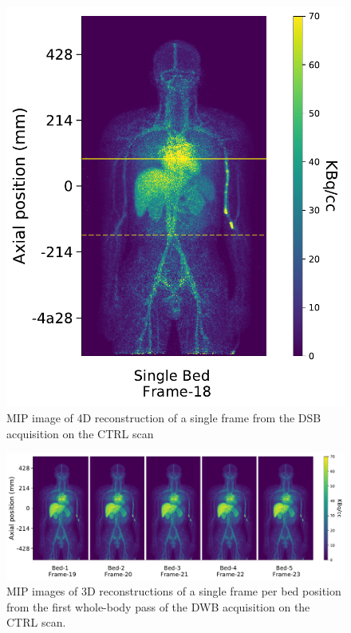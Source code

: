 \begin{figure} [h!]
\centering
\includegraphics[scale=0.52,angle=0]{3_Results/3_3_DWB_Reconstruction/figures/3_3_IsotoPK_CTRL_DSB_4D.pdf}
\caption{MIP image of 4D reconstruction of a single frame from the DSB acquisition on the CTRL scan}
\label{fig_3_3:IsotoPK_CTRL_DSB_4D}
\end{figure} 

\begin{figure} [h!]
\centering
\includegraphics[scale=0.52,angle=0]{3_Results/3_3_DWB_Reconstruction/figures/3_3_IsotoPK_CTRL_DWB_4D.pdf}
\caption{MIP images of 3D reconstructions of a single frame per bed position from the first whole-body pass of the DWB acquisition on the CTRL scan.}
\label{fig_3_3:IsotoPK_CTRL_DWB_4D}
\end{figure} 



